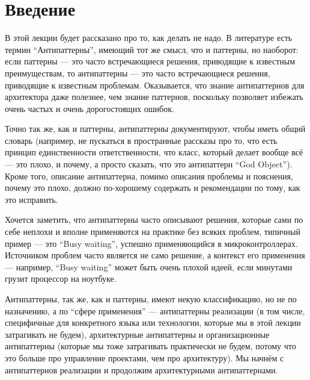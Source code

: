 \documentclass{../../text-style}
\begin{document}
\maketitle
\thispagestyle{empty}

\section{Введение}

В этой лекции будет рассказано про то, как делать не надо. В литературе есть термин ``Антипаттерны'', имеющий тот же смысл, что и паттерны, но наоборот: если паттерны --- это часто встречающиеся решения, приводящие к известным преимуществам, то антипаттерны --- это часто встречающиеся решения, приводящие к известным проблемам. Оказывается, что знание антипаттернов для архитектора даже полезнее, чем знание паттернов, поскольку позволяет избежать очень частых и очень дорогостоящих ошибок.

Точно так же, как и паттерны, антипаттерны документируют, чтобы иметь общий словарь (например, не пускаться в пространные рассказы про то, что есть принцип единственности ответственности, что класс, который делает вообще всё --- это плохо, и почему, а просто сказать, что это антипаттерн ``God Object''). Кроме того, описание антипаттерна, помимо описания проблемы и пояснения, почему это плохо, должно по-хорошему содержать и рекомендации по тому, как это исправить. 

Хочется заметить, что антипаттерны часто описывают решения, которые сами по себе неплохи и вполне применяются на практике без всяких проблем, типичный пример --- это ``Busy waiting'', успешно применяющийся в микроконтроллерах. Источником проблем часто является не само решение, а контекст его применения --- например, ``Busy waiting'' может быть очень плохой идеей, если минутами грузит процессор на ноутбуке.

Антипаттерны, так же, как и паттерны, имеют некую классификацию, но не по назначению, а по ``сфере применения'' --- антипаттерны реализации (в том числе, специфичные для конкретного языка или технологии, которые мы в этой лекции затрагивать не будем), архитектурные антипаттерны и организационные антипаттерны (которые мы тоже затрагивать практически не будем, потому что это больше про управление проектами, чем про архитектуру). Мы начнём с антипаттернов реализации и продолжим архитектурными антипаттернами.
\end{document}
